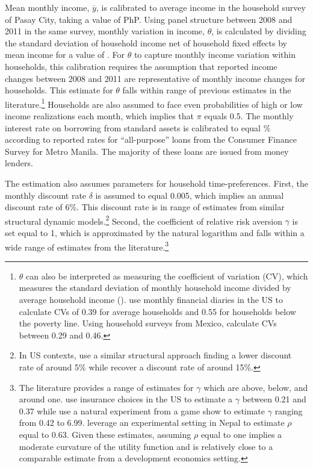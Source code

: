 \documentclass[12pt]{article}
\begin{document}
Mean monthly income, $\overline{y}$, is calibrated to average income in the household survey of Pasay City, taking a value of PhP.  Using panel structure between 2008 and 2011 in the same survey, monthly variation in income, $\theta$, is calculated by dividing the standard deviation of household income net of household fixed effects by mean income for a value of \unskip.  For $\theta$ to capture monthly income variation within households, this calibration requires the assumption that reported income changes between 2008 and 2011 are representative of monthly income changes for households.  This estimate for $\theta$ falls within range of previous estimates in the literature.\footnote{$\theta$ can also be interpreted as measuring the coefficient of variation (CV), which measures the standard deviation of monthly household income divided by average household income (\cite{hannagan2015income}).  \cite{hannagan2015income} use monthly financial diaries in the US to calculate CVs of 0.39 for average households and 0.55 for households below the poverty line.  Using household surveys from Mexico, \cite{amuedo2011remittances} calculate CVs between 0.29 and 0.46.}  Households are also assumed to face even probabilities of high or low income realizations each month, which implies that $\pi$ equals 0.5.  The monthly interest rate on borrowing from standard assets is calibrated to equal \unskip\% according to reported rates for ``all-purpose'' loans from the Consumer Finance Survey for Metro Manila.  The majority of these loans are issued from money lenders.

The estimation also assumes parameters for household time-preferences.  First, the monthly discount rate $\delta$ is assumed to equal 0.005, which implies an annual discount rate of 6\%. This discount rate is in range of estimates from similar structural dynamic models.\footnote{In US contexts,\cite{gourinchas2002consumption} use a similar structural approach finding a lower discount rate of around 5\% while \cite{laibson2007estimating} recover a discount rate of around 15\%.}  Second, the coefficient of relative risk aversion $\gamma$ is set equal to 1, which is approximated by the natural logarithm and falls within a wide range of estimates from the literature.\footnote{The literature provides a range of estimates for $\gamma$ which are above, below, and around one.  \cite{barseghyan2013nature} use insurance choices in the US to estimate a $\gamma$ between 0.21 and 0.37 while  \cite{beetsma2001measuring} use a natural experiment from a game show to estimate $\gamma$ ranging from 0.42 to 6.99.  \cite{carvalho2016effect} leverage an experimental setting in Nepal to estimate $\rho$ equal to 0.63.  Given these estimates, assuming $\rho$ equal to one implies a moderate curvature of the utility function and is relatively close to a comparable estimate from a development economics setting.}
\end{document}
